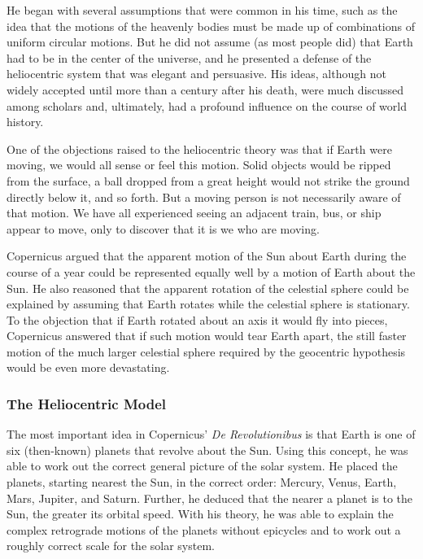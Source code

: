 \documentclass[main.tex]{subfiles}
\begin{document}
\vspace{1em}

He began with several assumptions that were common in his time, such as the idea that the motions of the heavenly bodies must be made up of combinations of uniform circular motions. But he did not assume (as most people did) that Earth had to be in the center of the universe, and he presented a defense of the heliocentric system that was elegant and persuasive. His ideas, although not widely accepted until more than a century after his death, were much discussed among scholars and, ultimately, had a profound influence on the course of world history.

\vspace{1em}

One of the objections raised to the heliocentric theory was that if Earth were moving, we would all sense or feel this motion. Solid objects would be ripped from the surface, a ball dropped from a great height would not strike the ground directly below it, and so forth. But a moving person is not necessarily aware of that motion. We have all experienced seeing an adjacent train, bus, or ship appear to move, only to discover that it is we who are moving.

\vspace{1em}

Copernicus argued that the apparent motion of the Sun about Earth during the course of a year could be represented equally well by a motion of Earth about the Sun. He also reasoned that the apparent rotation of the celestial sphere could be explained by assuming that Earth rotates while the celestial sphere is stationary. To the objection that if Earth rotated about an axis it would fly into pieces, Copernicus answered that if such motion would tear Earth apart, the still faster motion of the much larger celestial sphere required by the geocentric hypothesis would be even more devastating.

\subsubsection*{The Heliocentric Model}

The most important idea in Copernicus' \textit{De Revolutionibus} is that Earth is one of six (then-known) planets that revolve about the Sun. Using this concept, he was able to work out the correct general picture of the solar system. He placed the planets, starting nearest the Sun, in the correct order: Mercury, Venus, Earth, Mars, Jupiter, and Saturn. Further, he deduced that the nearer a planet is to the Sun, the greater its orbital speed. With his theory, he was able to explain the complex retrograde motions of the planets without epicycles and to work out a roughly correct scale for the solar system.
\end{document}
